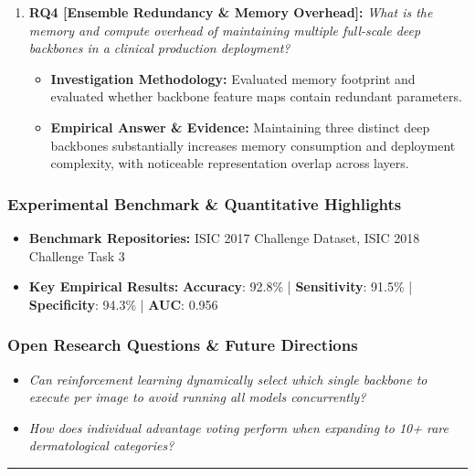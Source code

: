 \begin{enumerate}[label=\textbf{\arabic*.}, leftmargin=*]
\begin{itemize}[leftmargin=1.5em]
  \end{itemize}
  \item \textbf{RQ4 [Ensemble Redundancy \& Memory Overhead]:} \textit{What is the memory and compute overhead of maintaining multiple full-scale deep backbones in a clinical production deployment?}
  \begin{itemize}[leftmargin=1.5em]
    \item \textbf{Investigation Methodology:} Evaluated memory footprint and evaluated whether backbone feature maps contain redundant parameters.
    \item \textbf{Empirical Answer \& Evidence:} Maintaining three distinct deep backbones substantially increases memory consumption and deployment complexity, with noticeable representation overlap across layers.
  \end{itemize}
\end{enumerate}

\subsubsection*{Experimental Benchmark \& Quantitative Highlights}
\begin{itemize}[leftmargin=*]
  \item \textbf{Benchmark Repositories:} ISIC 2017 Challenge Dataset, ISIC 2018 Challenge Task 3
  \item \textbf{Key Empirical Results:} \textbf{Accuracy}: 92.8\% \quad | \quad \textbf{Sensitivity}: 91.5\% \quad | \quad \textbf{Specificity}: 94.3\% \quad | \quad \textbf{AUC}: 0.956
\end{itemize}

\subsubsection*{Open Research Questions \& Future Directions}
\begin{itemize}[leftmargin=*]
  \item \textit{Can reinforcement learning dynamically select which single backbone to execute per image to avoid running all models concurrently?}
  \item \textit{How does individual advantage voting perform when expanding to 10+ rare dermatological categories?}
\end{itemize}
\vspace{0.8em}\hrule\vspace{1.2em}
